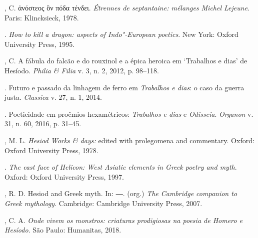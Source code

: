 \begin{bibliohedra}
, C. ἀνόστεος ὃν πόδα τένδει. \emph{Étrennes de septantaine:
mélanges Michel Lejeune}. Paris: Klincksieck, 1978.

\titidem. \emph{How to kill a dragon: aspects of Indo"-European poetics}. New
York: Oxford University Press, 1995.

, C. A fábula do falcão e do rouxinol e a épica heroica em
`Trabalhos e dias' de Hesíodo. \emph{Philia \& Filia} v. 3, n. 2, 2012,
p. 98--118.

\titidem. Futuro e passado da linhagem de ferro em \emph{Trabalhos e dias}: o
caso da guerra justa. \emph{Classica} v. 27, n. 1, 2014.

\titidem. Poeticidade em proêmios hexamétricos: \emph{Trabalhos e dias} e
\emph{Odisseia}. \emph{Organon} v. 31, n. 60, 2016, p. 31--45.

, M. L. \emph{Hesiod Works \& days:} edited with prolegomena and
commentary. Oxford: Oxford University Press, 1978.

\titidem. \emph{The east face of Helicon: West Asiatic elements in Greek poetry
and myth}. Oxford: Oxford University Press, 1997.

, R. D. Hesiod and Greek myth. In: ―. (org.) \emph{The Cambridge
companion to Greek mythology}. Cambridge: Cambridge University Press,
2007.

, C. A. \emph{Onde vivem os monstros: criaturas prodigiosas na
poesia de Homero e Hesíodo}. São Paulo: Humanitas, 2018.
\end{bibliohedra}

